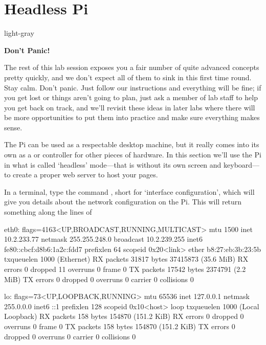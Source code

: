 \FloatBarrier

\section{Headless Pi}
\label{section:headless}

\begin{stdframe}{light-gray}%
  \centerline{\textbf{Don't Panic!}}
The rest of this lab session exposes you a fair number of quite advanced concepts pretty quickly, and we don't expect all of them to sink in this first time round. Stay calm.  Don't panic. Just follow our instructions and everything will be fine; if you get lost or things aren't going to plan, just ask a member of lab staff to help you get back on track, and we'll revisit these ideas in later labs where there will be more opportunities to put them into practice and make sure everything makes sense.
\end{stdframe}

The Pi can be used as a respectable desktop machine, but it really comes into its own as a  or controller for other pieces of hardware. In this section we'll use the Pi in what is called `headless' mode---that is without its own screen and keyboard---to create a proper web server to host your pages.

In a terminal, type the command , short for `interface configuration', which will give you details about the network configuration on the Pi. This will return something along the lines of

\begin{ttoutenv}
eth0: flags=4163<UP,BROADCAST,RUNNING,MULTICAST>  mtu 1500
        inet 10.2.233.77  netmask 255.255.248.0  broadcast 10.2.239.255
        inet6 fe80::cbcf:d8b6:1a2c:fdd7  prefixlen 64  scopeid 0x20<link>
        ether b8:27:eb:3b:23:5b  txqueuelen 1000  (Ethernet)
        RX packets 31817  bytes 37415873 (35.6 MiB)
        RX errors 0  dropped 11  overruns 0  frame 0
        TX packets 17542  bytes 2374791 (2.2 MiB)
        TX errors 0  dropped 0 overruns 0  carrier 0  collisions 0

lo: flags=73<UP,LOOPBACK,RUNNING>  mtu 65536
        inet 127.0.0.1  netmask 255.0.0.0
        inet6 ::1  prefixlen 128  scopeid 0x10<host>
        loop  txqueuelen 1000  (Local Loopback)
        RX packets 158  bytes 154870 (151.2 KiB)
        RX errors 0  dropped 0  overruns 0  frame 0
        TX packets 158  bytes 154870 (151.2 KiB)
        TX errors 0  dropped 0 overruns 0  carrier 0  collisions 0
\end{ttoutenv}

